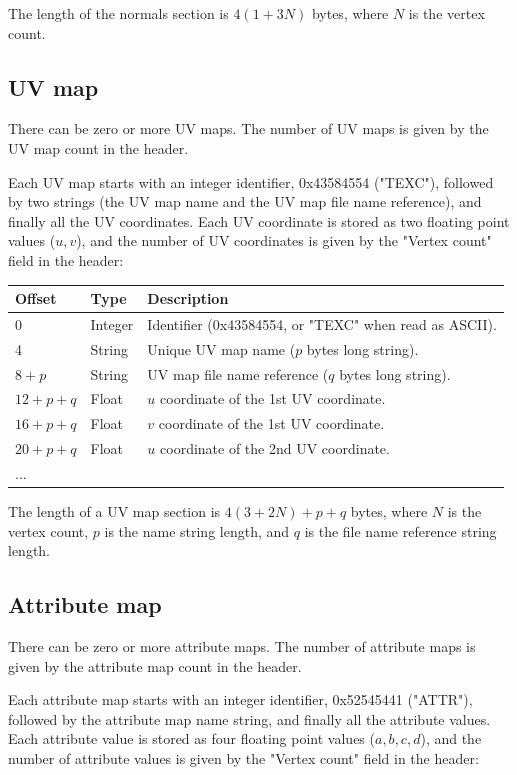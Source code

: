 The length of the normals section is $4(1+3N)$ bytes, where $N$ is the vertex
count.

\subsection{UV map}
There can be zero or more UV maps. The number of UV maps is given by the
UV map count in the header.

Each UV map starts with an integer identifier, 0x43584554 ("TEXC"), followed
by two strings (the UV map name and the UV map file name reference), and
finally all the UV coordinates. Each UV coordinate is stored as two floating point
values ($u,v$), and the number of UV coordinates is given by the "Vertex count"
field in the header:

\begin{tabular}{|l|l|l|}\hline
\textbf{Offset} &  \textbf{Type} & \textbf{Description}\\ \hline
0 & Integer & Identifier (0x43584554, or "TEXC" when read as ASCII).\\ \hline
4 & String & Unique UV map name ($p$ bytes long string).\\ \hline
$8+p$ & String & UV map file name reference ($q$ bytes long string).\\ \hline
$12+p+q$ & Float & $u$ coordinate of the 1st UV coordinate.\\ \hline
$16+p+q$ & Float & $v$ coordinate of the 1st UV coordinate.\\ \hline
$20+p+q$ & Float & $u$ coordinate of the 2nd UV coordinate.\\ \hline
... & & \\ \hline
\end{tabular}

The length of a UV map section is $4(3+2N)+p+q$ bytes, where $N$ is the vertex
count, $p$ is the name string length, and $q$ is the file name reference string
length.

\subsection{Attribute map}
There can be zero or more attribute maps. The number of attribute maps is given by the
attribute map count in the header.

Each attribute map starts with an integer identifier, 0x52545441 ("ATTR"), followed
by the attribute map name string, and finally all the attribute values. Each attribute
value is stored as four floating point values ($a,b,c,d$), and the number of
attribute values is given by the "Vertex count" field in the header:

